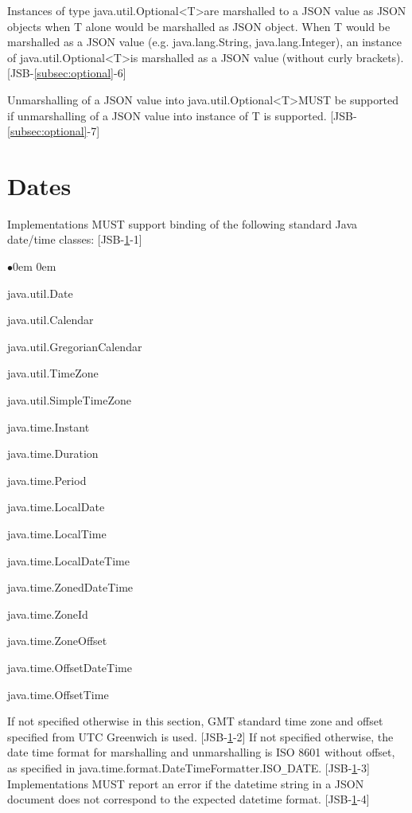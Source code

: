 Instances of type java.util.Optional\textless T\textgreater\space are marshalled to a JSON value as JSON objects when T alone would be marshalled as JSON object. 
When T would be marshalled as a JSON value (e.g. java.lang.String, java.lang.Integer), an instance of java.util.Optional\textless T\textgreater\space is marshalled as a JSON value (without curly brackets). [JSB-\ref{subsec:optional}-6]

Unmarshalling of a JSON value into java.util.Optional\textless T\textgreater\space MUST be supported if unmarshalling of a JSON value into instance of T is supported. [JSB-\ref{subsec:optional}-7]

\section{Dates}
\label{sec:dates}
Implementations MUST support binding of the following standard Java date/time classes: 
[JSB-\ref{sec:dates}-1]
\begin{list}{$\bullet$}{\parsep 0em  0em}
\item java.util.Date
\item java.util.Calendar
\item java.util.GregorianCalendar
\item java.util.TimeZone
\item java.util.SimpleTimeZone
\item java.time.Instant
\item java.time.Duration
\item java.time.Period
\item java.time.LocalDate
\item java.time.LocalTime
\item java.time.LocalDateTime
\item java.time.ZonedDateTime
\item java.time.ZoneId
\item java.time.ZoneOffset
\item java.time.OffsetDateTime
\item java.time.OffsetTime
\end{list}

If not specified otherwise in this section, GMT standard time zone and offset specified from UTC Greenwich is used. [JSB-\ref{sec:dates}-2]
If not specified otherwise, the date time format for marshalling and unmarshalling is ISO 8601 without offset, as specified in java.time.format.DateTimeFormatter.ISO\verb|_|DATE. [JSB-\ref{sec:dates}-3]
Implementations MUST report an error if the datetime string in a JSON document does not correspond to the expected datetime format. [JSB-\ref{sec:dates}-4]

